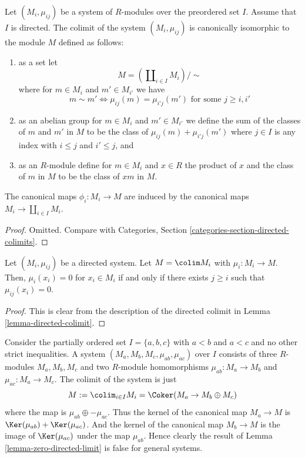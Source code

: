 \begin{lemma}
\label{lemma-directed-colimit}
Let $(M_i, \mu_{ij})$ be a system of $R$-modules over the
preordered set $I$. Assume that $I$ is directed.
The colimit of the system $(M_i, \mu_{ij})$ is canonically
isomorphic to the module $M$ defined as follows:
\begin{enumerate}
\item as a set let
$$
M = \left(\coprod\nolimits_{i \in I} M_i\right)/\sim
$$
where for $m \in M_i$ and $m' \in M_{i'}$ we have
$$
m \sim m' \Leftrightarrow
\mu_{ij}(m) = \mu_{i'j}(m')\text{ for some }j \geq i, i'
$$
\item as an abelian group for $m \in M_i$ and $m' \in M_{i'}$
we define the sum of the classes of $m$ and $m'$ in $M$
to be the class of $\mu_{ij}(m) + \mu_{i'j}(m')$ where
$j \in I$ is any index with $i \leq j$ and $i' \leq j$, and
\item as an $R$-module define for $m \in M_i$ and $x \in R$
the product of $x$ and the class of $m$ in $M$ to be the
class of $xm$ in $M$.
\end{enumerate}
The canonical maps $\phi_i : M_i \to M$ are induced by the canonical
maps $M_i \to \coprod_{i \in I} M_i$.
\end{lemma}

\begin{proof}
Omitted. Compare with
Categories, Section \ref{categories-section-directed-colimits}.
\end{proof}

\begin{lemma}
\label{lemma-zero-directed-limit}
Let $(M_i, \mu_{ij})$ be a directed system.
Let $M = \colim M_i$ with $\mu_i : M_i \to M$.
Then, $\mu_i(x_i) = 0$ for $x_i \in M_i$ if and only if
there exists $j \geq i$ such that $\mu_{ij}(x_i) = 0$.
\end{lemma}

\begin{proof}
This is clear from the description of the directed colimit
in Lemma \ref{lemma-directed-colimit}.
\end{proof}

\begin{example}
\label{example-zero-colimit-different}
Consider the partially ordered set $I = \{a, b, c\}$ with
$a < b$ and $a < c$ and no other strict inequalities.
A system $(M_a, M_b, M_c, \mu_{ab}, \mu_{ac})$
over $I$ consists of three $R$-modules $M_a, M_b, M_c$
and two $R$-module homomorphisms $\mu_{ab} : M_a \to M_b$ and
$\mu_{ac} : M_a \to M_c$.
The colimit of the system is just
$$
M := \colim_{i \in I} M_i = \Coker(M_a \to M_b \oplus M_c)
$$
where the map is $\mu_{ab} \oplus -\mu_{ac}$. Thus the kernel of the
canonical map $M_a \to M$ is $\Ker(\mu_{ab}) + \Ker(\mu_{ac})$.
And the kernel of the canonical map $M_b \to M$ is the image of
$\Ker(\mu_{ac})$ under the map $\mu_{ab}$. Hence clearly
the result of Lemma \ref{lemma-zero-directed-limit} is false for
general systems.
\end{example}

